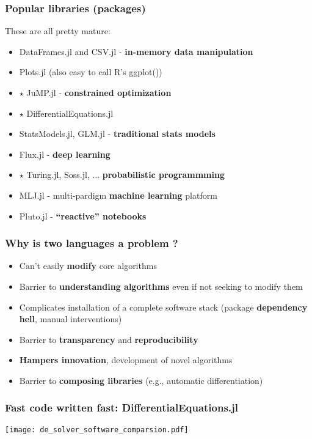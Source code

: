 \documentclass[t]{beamer}
\newcommand\df{\bf\color{Maroon}}
\begin{document}
\begin{frame}
  \frametitle{Popular libraries (packages)}
  These are all pretty mature:
  \begin{itemize}
  \item DataFrames.jl and CSV.jl  - {\df in-memory data manipulation}
  \item Plots.jl (also easy to call R's ggplot())
  \item $\star$ JuMP.jl - {\df constrained optimization}
  \item $\star$ DifferentialEquations.jl
  \item StatsModels.jl, GLM.jl - {\df traditional stats models}
  \item Flux.jl  - {\df deep learning}
  \item $\star$ Turing.jl, Soss.jl, ... {\df probabilistic programmming}
  \item MLJ.jl - multi-pardigm {\df machine learning} platform
  \item Pluto.jl - {\df ``reactive'' notebooks}
  \end{itemize}
\end{frame}



\begin{frame}
  \frametitle{Why  is two languages a problem ?}
  \begin{itemize}
    \item Can't easily {\df modify} core algorithms
    \item Barrier to {\df understanding algorithms} even if not seeking to modify them
    \item Complicates installation of a complete software stack
    (package {\df dependency hell}, manual interventions)
    \item Barrier to {\df transparency} and {\df reproducibility}
    \item {\df Hampers innovation}, development of novel algorithms
    \item Barrier to {\df composing libraries} (e.g., automatic differentiation)
  \end{itemize}
\end{frame}



\begin{frame}[plain]
  \frametitle{Fast code written fast: DifferentialEquations.jl}
     \texttt{[image: de\_solver\_software\_comparsion.pdf]}
\end{frame}
\end{document}

